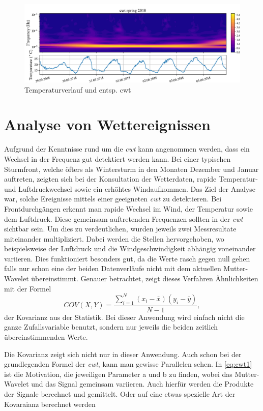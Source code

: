 \begin{refsection}
\begin{figure}[b]
	\centering
	\includegraphics[width=1\textwidth]{papers/wwt/images/data_spring.pdf}
	\caption{Temperaturverlauf und entsp. cwt}
	\label{fig:cwt_zoom}
\end{figure}




\section{Analyse von Wettereignissen}
Aufgrund der Kenntnisse rund um die \textit{cwt} kann angenommen werden, dass ein Wechsel in der Frequenz gut detektiert werden kann.
Bei einer typischen Sturmfront, welche öfters als Wintersturm in den Monaten Dezember und Januar auftreten, zeigten sich bei der Konsultation der Wetterdaten, rapide Temperatur- und Luftdruckwechsel sowie ein erhöhtes Windaufkommen.
Das Ziel der Analyse war, solche Ereignisse mittels einer geeigneten \textit{cwt} zu detektieren.
Bei Frontdurchgängen erkennt man rapide Wechsel im Wind, der Temperatur sowie dem Luftdruck.
Diese gemeinsam auftretenden Frequenzen sollten in der \textit{cwt} sichtbar sein.
Um dies zu verdeutlichen, wurden jeweils zwei Messresultate miteinander multipliziert. Dabei werden die Stellen hervorgehoben, wo beispielsweise der Luftdruck und die Windgeschwindigkeit abhängig voneinander variieren.  
Dies funktioniert besonders gut, da die Werte rasch gegen null gehen falls nur schon eine der beiden Datenverläufe nicht mit dem aktuellen Mutter-Wavelet übereinstimmt.
Genauer betrachtet, zeigt dieses Verfahren Ähnlichkeiten mit der Formel
\begin{equation}
COV(X,Y) = \frac{\sum_{i=1}^{N} (x_i- \bar{x})(y_i- \bar{y})}{N-1},
\end{equation}
der Kovarianz aus der Statistik. Bei dieser Anwendung wird einfach nicht die ganze Zufallsvariable benutzt, sondern nur jeweils die beiden zeitlich übereinstimmenden Werte.

Die Kovarianz zeigt sich nicht nur in dieser Anwendung. Auch schon bei der grundlegenden Formel der \textit{cwt}, kann man gewisse Parallelen sehen. 
In \ref{eq:cwt1} ist die Motivation, die jeweiligen Parameter a und b zu finden, wobei das Mutter-Wavelet und das Signal gemeinsam variieren.
Auch hierfür werden die Produkte der Signale berechnet und gemittelt.
Oder auf eine etwas spezielle Art der Kovaraianz berechnet werden
 

\end{refsection}
